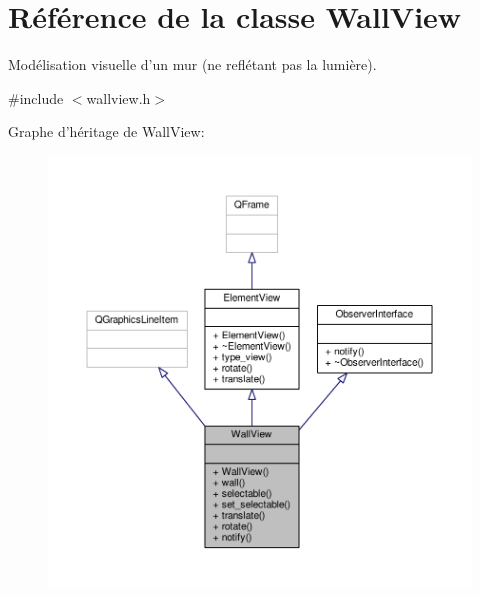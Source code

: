 \hypertarget{classWallView}{\section{Référence de la classe Wall\+View}
\label{classWallView}
}


Modélisation visuelle d’un mur (ne reflétant pas la lumière).  




{\ttfamily \#include $<$wallview.\+h$>$}



Graphe d'héritage de Wall\+View\+:\nopagebreak
\begin{figure}[H]
\begin{center}
\leavevmode
\includegraphics[width=350pt]{dd/dc1/classWallView__inherit__graph}
\end{center}
\end{figure}


